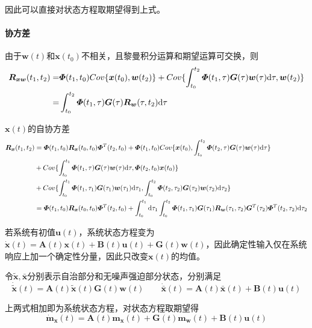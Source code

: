 \documentclass[11pt,a4paper]{ctexart}
\renewcommand{\d}{{\rm d}}
\begin{document}
            因此可以直接对状态方程取期望得到上式。

            \paragraph{协方差}\leavevmode
            
            由于$\bm{w}(t)$和$\bm{x}(t_0)$不相关，且黎曼积分运算和期望运算可交换，则
            \begin{align*}
            \bm{R_{xw}}(t_1,t_2)=&\bm{\varPhi}(t_1,t_0)Cov\{\bm{x}(t_0),\bm{w}(t_2)\}+Cov\{\int_{t_0}^{t_2}\bm{\varPhi}(t_1,\tau)\bm{G}(\tau)\bm{w}(\tau)\d\tau,\bm{w}(t_2)\}\\
            =&\int_{t_0}^{t_2}\bm{\varPhi}(t_1,\tau)\bm{G}(\tau)\bm{R_w}(\tau,t_2)\d\tau
            \end{align*}

            $\bm{x}(t)$的自协方差
            \begin{align*}
            \bm{R_x}(t_1,t_2)&=\bm{\varPhi}(t_1,t_0)\bm{R_x}(t_0,t_0)\bm{\varPhi}^T(t_2,t_0)+\bm{\varPhi}(t_1,t_0)Cov\{\bm{x}(t_0),\int_{t_0}^{t_2}\bm{\varPhi}(t_2,\tau)\bm{G}(\tau)\bm{w}(\tau)\d\tau\}\\
            &+Cov\{\int_{t_0}^{t_1}\bm{\varPhi}(t_1,\tau)\bm{G}(\tau)\bm{w}(\tau)\d\tau,\bm{\varPhi}(t_2,t_0)\bm{x}(t_0)\}\\
            &+Cov\{\int_{t_0}^{t_1}\bm{\varPhi}(t_1,\tau_1)\bm{G}(\tau_1)\bm{w}(\tau_1)\d\tau_1,\int_{t_0}^{t_2}\bm{\varPhi}(t_2,\tau_2)\bm{G}(\tau_2)\bm{w}(\tau_2)\d\tau_2\}\\
            &=\bm{\varPhi}(t_1,t_0)\bm{R_x}(t_0,t_0)\bm{\varPhi}^T(t_2,t_0)+\int_{t_0}^{t_1}\d\tau_1\int_{t_0}^{t_2}\bm{\varPhi}(t_1,\tau_1)\bm{G}(\tau_1)\bm{R_w}(\tau_1,\tau_2)\bm{G}^T(\tau_2)\bm{\varPhi}^T(t_2,\tau_2)\d\tau_2
            \end{align*}

            若系统有初值$\bm{u}(t)$，系统状态方程变为$\bm{\dot{x}}(t)=\bm{A}(t)\bm{x}(t)+\bm{B}(t)\bm{u}(t)+\bm{G}(t)\bm{w}(t)$，因此确定性输入仅在系统响应上加一个确定性分量，因此只改变$\bm{x}(t)$的均值。

            令$\bm{\tilde x},\bm{\bar x}$分别表示自治部分和无噪声强迫部分状态，分别满足
            \[
            \bm{\dot{\tilde x}}(t)=\bm{A}(t)\bm{\tilde x}(t)\bm{G}(t)\bm{w}(t)\qquad
            \bm{\dot{\bar x}}(t)=\bm{A}(t)\bm{\bar x}(t)+\bm{B}(t)\bm{u}(t)
            \]

            上两式相加即为系统状态方程，对状态方程取期望得
            \[
            \bm{\dot m_x}(t)=\bm{A}(t)\bm{m_x}(t)+\bm{G}(t)\bm{m_w}(t)+\bm{B}(t)\bm{u}(t)
            \]
\end{document}
